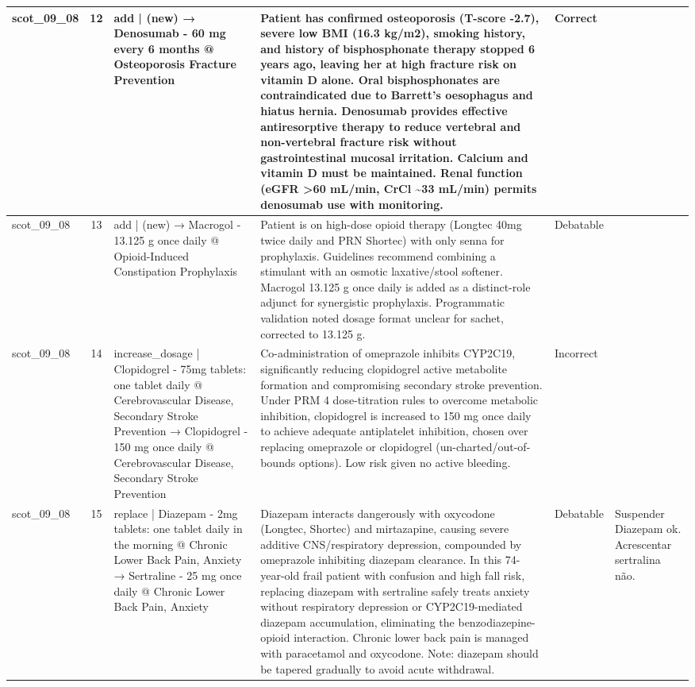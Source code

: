 \begin{longtable}{|p{1.45cm}|c|p{3.3cm}|p{6.5cm}|p{1.55cm}|p{2.3cm}|}
\hline
scot\_09\_08 & 12 & add | (new) → Denosumab - 60 mg every 6 months @ Osteoporosis Fracture Prevention & Patient has confirmed osteoporosis (T-score -2.7), severe low BMI (16.3 kg/m2), smoking history, and history of bisphosphonate therapy stopped 6 years ago, leaving her at high fracture risk on vitamin D alone. Oral bisphosphonates are contraindicated due to Barrett's oesophagus and hiatus hernia. Denosumab provides effective antiresorptive therapy to reduce vertebral and non-vertebral fracture risk without gastrointestinal mucosal irritation. Calcium and vitamin D must be maintained. Renal function (eGFR >60 mL/min, CrCl \textasciitilde{}33 mL/min) permits denosumab use with monitoring. & Correct &  \\
\hline
scot\_09\_08 & 13 & add | (new) → Macrogol - 13.125 g once daily @ Opioid-Induced Constipation Prophylaxis & Patient is on high-dose opioid therapy (Longtec 40mg twice daily and PRN Shortec) with only senna for prophylaxis. Guidelines recommend combining a stimulant with an osmotic laxative/stool softener. Macrogol 13.125 g once daily is added as a distinct-role adjunct for synergistic prophylaxis. Programmatic validation noted dosage format unclear for sachet, corrected to 13.125 g. & Debatable &  \\
\hline
scot\_09\_08 & 14 & increase\_dosage | Clopidogrel - 75mg tablets: one tablet daily @ Cerebrovascular Disease, Secondary Stroke Prevention → Clopidogrel - 150 mg once daily @ Cerebrovascular Disease, Secondary Stroke Prevention & Co-administration of omeprazole inhibits CYP2C19, significantly reducing clopidogrel active metabolite formation and compromising secondary stroke prevention. Under PRM 4 dose-titration rules to overcome metabolic inhibition, clopidogrel is increased to 150 mg once daily to achieve adequate antiplatelet inhibition, chosen over replacing omeprazole or clopidogrel (un-charted/out-of-bounds options). Low risk given no active bleeding. & Incorrect &  \\
\hline
scot\_09\_08 & 15 & replace | Diazepam - 2mg tablets: one tablet daily in the morning @ Chronic Lower Back Pain, Anxiety → Sertraline - 25 mg once daily @ Chronic Lower Back Pain, Anxiety & Diazepam interacts dangerously with oxycodone (Longtec, Shortec) and mirtazapine, causing severe additive CNS/respiratory depression, compounded by omeprazole inhibiting diazepam clearance. In this 74-year-old frail patient with confusion and high fall risk, replacing diazepam with sertraline safely treats anxiety without respiratory depression or CYP2C19-mediated diazepam accumulation, eliminating the benzodiazepine-opioid interaction. Chronic lower back pain is managed with paracetamol and oxycodone. Note: diazepam should be tapered gradually to avoid acute withdrawal. & Debatable & Suspender Diazepam ok. Acrescentar sertralina não. \\

\end{longtable}
